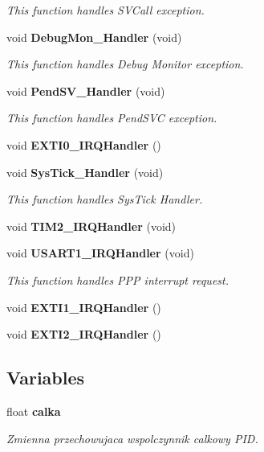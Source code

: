\begin{DoxyCompactItemize}
\begin{DoxyCompactList}\small\item\em This function handles S\+V\+Call exception. \end{DoxyCompactList}\item 
void \textbf{ Debug\+Mon\+\_\+\+Handler} (void)
\begin{DoxyCompactList}\small\item\em This function handles Debug Monitor exception. \end{DoxyCompactList}\item 
void \textbf{ Pend\+S\+V\+\_\+\+Handler} (void)
\begin{DoxyCompactList}\small\item\em This function handles Pend\+S\+VC exception. \end{DoxyCompactList}\item 
void \textbf{ E\+X\+T\+I0\+\_\+\+I\+R\+Q\+Handler} ()
\item 
void \textbf{ Sys\+Tick\+\_\+\+Handler} (void)
\begin{DoxyCompactList}\small\item\em This function handles Sys\+Tick Handler. \end{DoxyCompactList}\item 
void \textbf{ T\+I\+M2\+\_\+\+I\+R\+Q\+Handler} (void)
\item 
void \textbf{ U\+S\+A\+R\+T1\+\_\+\+I\+R\+Q\+Handler} (void)
\begin{DoxyCompactList}\small\item\em This function handles P\+PP interrupt request. \end{DoxyCompactList}\item 
void \textbf{ E\+X\+T\+I1\+\_\+\+I\+R\+Q\+Handler} ()
\item 
void \textbf{ E\+X\+T\+I2\+\_\+\+I\+R\+Q\+Handler} ()
\end{DoxyCompactItemize}
\subsection*{Variables}
\begin{DoxyCompactItemize}
\item 
float \textbf{ calka}
\begin{DoxyCompactList}\small\item\em Zmienna przechowujaca wspolczynnik calkowy P\+ID. \end{DoxyCompactList}\end{DoxyCompactItemize}


